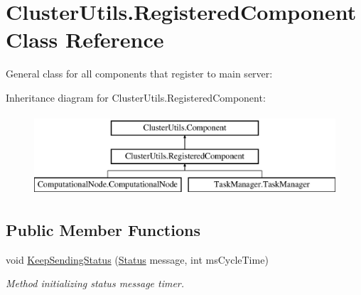 \hypertarget{class_cluster_utils_1_1_registered_component}{}\section{Cluster\+Utils.\+Registered\+Component Class Reference}
\label{class_cluster_utils_1_1_registered_component}


General class for all components that register to main server\+:  


Inheritance diagram for Cluster\+Utils.\+Registered\+Component\+:\begin{figure}[H]
\begin{center}
\leavevmode
\includegraphics[height=3.000000cm]{class_cluster_utils_1_1_registered_component}
\end{center}
\end{figure}
\subsection*{Public Member Functions}
\begin{DoxyCompactItemize}
\item 
void \hyperlink{class_cluster_utils_1_1_registered_component_a23c088583fe9393f1aed7b4cbf83b449}{Keep\+Sending\+Status} (\hyperlink{class_status}{Status} message, int ms\+Cycle\+Time)
\begin{DoxyCompactList}\small\item\em Method initializing status message timer. \end{DoxyCompactList}\end{DoxyCompactItemize}
